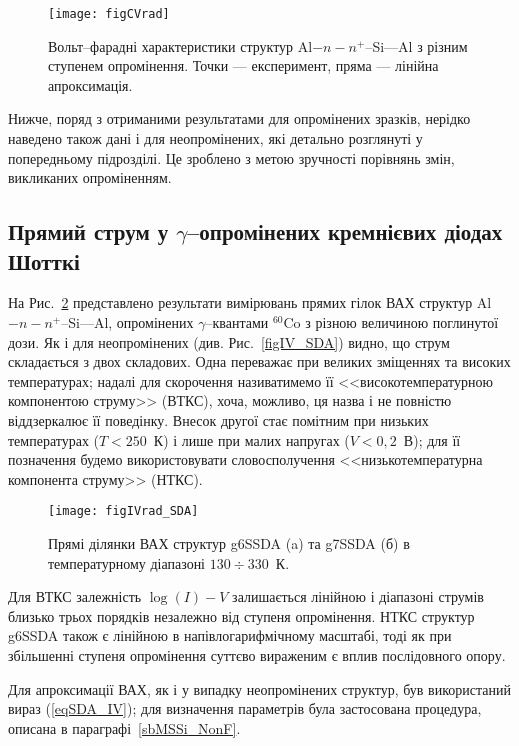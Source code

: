 \begin{figure}
\center
\texttt{[image: figCVrad]}
\caption{\label{figCVrad}
Вольт--фарадні характеристики структур Al$-n-n^+$--Si---Al з різним ступенем опромінення.
Точки --- експеримент, пряма --- лінійна апроксимація.
}%
\end{figure}


Нижче, поряд з отриманими результатами для опромінених зразків, нерідко наведено також дані і для неопромінених,
які детально розглянуті у попередньому підрозділі.
Це зроблено з метою зручності порівнянь змін, викликаних опроміненням.


\subsection{Прямий струм у $\gamma$--опромінених кремнієвих діодах Шотткі}

На Рис.~\ref{figIVrad_SDA} представлено результати вимірювань прямих гілок ВАХ структур Al$-n-n^+$--Si---Al, опромінених
$\gamma$--квантами $^{60}$Co з різною величиною поглинутої дози.
Як і для неопромінених (див. Рис.~\ref{figIV_SDA}) видно, що струм складається з двох складових.
Одна переважає при великих зміщеннях та високих температурах; надалі для скорочення називатимемо її
<<високотемпературною компонентою струму>> (ВТКС), хоча, можливо, ця назва і не повністю віддзеркалює її поведінку.
Внесок другої стає помітним при низьких температурах ($T<250$~К) і лише при малих напругах ($V<0,2$~В);
для її позначення будемо використовувати словосполучення <<низькотемпературна компонента струму>> (НТКС).


\begin{figure}
\center
\texttt{[image: figIVrad\_SDA]}
\caption{\label{figIVrad_SDA}
Прямі  ділянки ВАХ структур g6SSDA (a)  та g7SSDA (б) в температурному діапазоні $130\div330$~К.
}%
\end{figure}

Для ВТКС залежність $\log(I)-V$ залишається лінійною і діапазоні струмів близько трьох порядків незалежно від ступеня опромінення.
НТКС структур g6SSDA також є лінійною в напівлогарифмічному масштабі, тоді як при
збільшенні ступеня опромінення суттєво вираженим є вплив послідовного опору.

Для апроксимації ВАХ, як і у випадку неопромінених структур, був використаний вираз (\ref{eqSDA_IV});
для визначення параметрів була застосована процедура, описана в параграфі~\ref{sbMSSi_NonF}.

